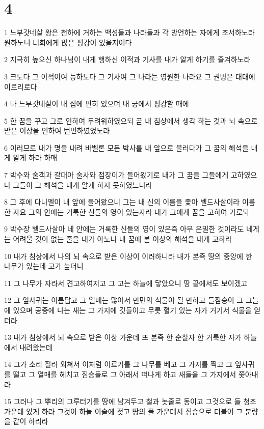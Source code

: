 \chapter{4}

\par 1 느부갓네살 왕은 천하에 거하는 백성들과 나라들과 각 방언하는 자에게 조서하노라 원하노니 너희에게 많은 평강이 있을지어다
\par 2 지극히 높으신 하나님이 내게 행하신 이적과 기사를 내가 알게 하기를 즐겨하노라
\par 3 크도다 그 이적이여 능하도다 그 기사여 그 나라는 영원한 나라요 그 권병은 대대에 이르리로다
\par 4 나 느부갓네살이 내 집에 편히 있으며 내 궁에서 평강할 때에
\par 5 한 꿈을 꾸고 그로 인하여 두려워하였으되 곧 내 침상에서 생각 하는 것과 뇌 속으로 받은 이상을 인하여 번민하였었노라
\par 6 이러므로 내가 명을 내려 바벨론 모든 박사를 내 앞으로 불러다가 그 꿈의 해석을 내게 알게 하라 하매
\par 7 박수와 술객과 갈대아 술사와 점장이가 들어왔기로 내가 그 꿈을 그들에게 고하였으나 그들이 그 해석을 내게 알게 하지 못하였느니라
\par 8 그 후에 다니엘이 내 앞에 들어왔으니 그는 내 신의 이름을 좇아 벨드사살이라 이름한 자요 그의 안에는 거룩한 신들의 영이 있는자라 내가 그에게 꿈을 고하여 가로되
\par 9 박수장 벨드사살아 네 안에는 거룩한 신들의 영이 있은즉 아무 은밀한 것이라도 네게는 어려울 것이 없는 줄을 내가 아노니 내 꿈에 본 이상의 해석을 내게 고하라
\par 10 내가 침상에서 나의 뇌 속으로 받은 이상이 이러하니라 내가 본즉 땅의 중앙에 한 나무가 있는데 고가 높더니
\par 11 그 나무가 자라서 견고하여지고 그 고는 하늘에 닿았으니 땅 끝에서도 보이겠고
\par 12 그 잎사귀는 아름답고 그 열매는 많아서 만민의 식물이 될 만하고 들짐승이 그 그늘에 있으며 공중에 나는 새는 그 가지에 깃들이고 무릇 혈기 있는 자가 거기서 식물을 얻더라
\par 13 내가 침상에서 뇌 속으로 받은 이상 가운데 또 본즉 한 순찰자 한 거룩한 자가 하늘에서 내려왔는데
\par 14 그가 소리 질러 외쳐서 이처럼 이르기를 그 나무를 베고 그 가지를 찍고 그 잎사귀를 떨고 그 열매를 헤치고 짐승들로 그 아래서 떠나게 하고 새들을 그 가지에서 쫓아내라
\par 15 그러나 그 뿌리의 그루터기를 땅에 남겨두고 철과 놋줄로 동이고 그것으로 들 청초 가운데 있게 하라 그것이 하늘 이슬에 젖고 땅의 풀 가운데서 짐승으로 더불어 그 분량을 같이 하리라
